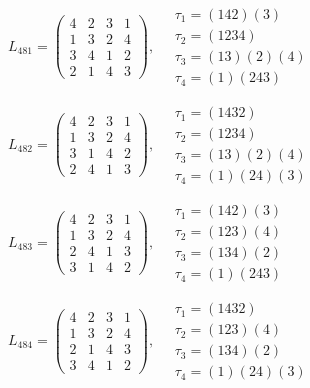 $L_{481} = \begin{pmatrix} 4 & 2 & 3 & 1 \\ 1 & 3 & 2 & 4 \\ 3 & 4 & 1 & 2 \\ 2 & 1 & 4 & 3 \end{pmatrix}, \quad \begin{matrix} \tau_{1} = (1 4 2)(3) \\ \tau_{2} = (1 2 3 4) \\ \tau_{3} = (1 3)(2)(4) \\ \tau_{4} = (1)(2 4 3) \end{matrix}$

$L_{482} = \begin{pmatrix} 4 & 2 & 3 & 1 \\ 1 & 3 & 2 & 4 \\ 3 & 1 & 4 & 2 \\ 2 & 4 & 1 & 3 \end{pmatrix}, \quad \begin{matrix} \tau_{1} = (1 4 3 2) \\ \tau_{2} = (1 2 3 4) \\ \tau_{3} = (1 3)(2)(4) \\ \tau_{4} = (1)(2 4)(3) \end{matrix}$

$L_{483} = \begin{pmatrix} 4 & 2 & 3 & 1 \\ 1 & 3 & 2 & 4 \\ 2 & 4 & 1 & 3 \\ 3 & 1 & 4 & 2 \end{pmatrix}, \quad \begin{matrix} \tau_{1} = (1 4 2)(3) \\ \tau_{2} = (1 2 3)(4) \\ \tau_{3} = (1 3 4)(2) \\ \tau_{4} = (1)(2 4 3) \end{matrix}$

$L_{484} = \begin{pmatrix} 4 & 2 & 3 & 1 \\ 1 & 3 & 2 & 4 \\ 2 & 1 & 4 & 3 \\ 3 & 4 & 1 & 2 \end{pmatrix}, \quad \begin{matrix} \tau_{1} = (1 4 3 2) \\ \tau_{2} = (1 2 3)(4) \\ \tau_{3} = (1 3 4)(2) \\ \tau_{4} = (1)(2 4)(3) \end{matrix}$

